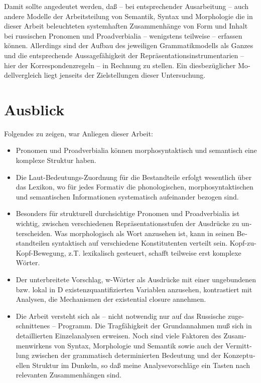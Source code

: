 \documentclass[output=paper, colorlinks, citecolor=brown, booklanguage=german]{langscibook}
\begin{document}
\begin{otherlanguage}{german}
Damit sollte angedeutet werden, daß -- bei entsprechender Ausarbeitung -- auch andere Modelle der Arbeitsteilung von Semantik, Syntax und Morphologie die in dieser Arbeit beleuchteten systemhaften Zusammenhänge von Form und Inhalt bei russischen Pronomen und Proadverbialia -- wenigstens teilweise -- erfassen können. Allerdings sind der Aufbau des jeweiligen Grammatikmo\-dells als Ganzes und die entsprechende Aussagefähigkeit der Repräsentations\-ins\-tru\-men\-ta\-rien -- hier der Korrespondenzregeln -- in Rechnung zu stellen. Ein diesbezüglicher Modellvergleich liegt jenseits der Zielstellungen dieser Untersuchung.

\section{Ausblick}\label{sec:zi02:ausblick}

Folgendes zu zeigen, war Anliegen dieser Arbeit:

\begin{itemize}
    \item Pronomen und Proadverbialia können morphosyntaktisch und semantisch eine komplexe Struktur haben.
    \item Die Laut-Bedeutungs-Zuordnung für die Bestandteile erfolgt wesentlich über das Lexikon, wo für jedes Formativ die phonologischen, morphosyntaktischen und semantischen Informationen systematisch aufeinander bezogen sind.
    \item Besonders für strukturell durchsichtige Pronomen und Proadverbialia ist wichtig, zwischen verschiedenen Repräsentationsstufen der Ausdrücke zu unterscheiden. Was morphologisch als Wort anzusehen ist, kann in seinen Bestandteilen syntaktisch auf verschiedene Konstitutenten verteilt sein. Kopf-zu-Kopf-Bewegung, z.T. lexikalisch gesteuert, schafft teilweise erst komplexe Wörter.
    \item Der unterbreitete Vorschlag, w-Wörter als Ausdrücke mit einer ungebundenen bzw. lokal in D existenzquantifizierten Variablen anzusehen, kontrastiert mit Analysen, die Mechanismen der existential closure annehmen.
    \item Die Arbeit versteht sich als -- nicht notwendig nur auf das Russische zu\-ge\-schnit\-te\-nes -- Programm. Die Tragfähigkeit der Grundannahmen muß sich in detaillierten Einzelanalysen erweisen. Noch sind viele Faktoren des Zusammenwirkens von Syntax, Morphologie und Semantik sowie auch der Vermittlung zwischen der grammatisch determinierten Bedeutung und der Kon\-zep\-tu\-el\-len Struktur im Dunkeln, so daß meine Analysevorschläge ein Tasten nach relevanten Zusammenhängen sind.
\end{itemize}


\end{otherlanguage}
\end{document}
